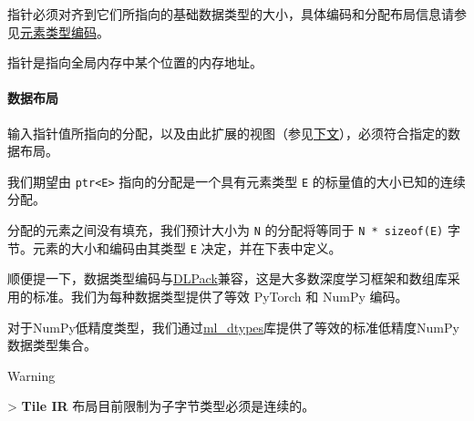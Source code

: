 \documentclass{article}
\begin{document}
指针必须对齐到它们所指向的基础数据类型的大小，具体编码和分配布局信息请参见\href{https://docs.nvidia.com/cuda/tile-ir/latest/sections/semantics.html#element-type-encoding}{元素类型编码}。


指针是指向全局内存中某个位置的内存地址。


\paragraph{数据布局}

输入指针值所指向的分配，以及由此扩展的视图（参见\href{https://docs.nvidia.com/cuda/tile-ir/latest/sections/types.html#type-views}{下文}），必须符合指定的数据布局。


我们期望由 \texttt{ptr<E>} 指向的分配是一个具有元素类型 \texttt{E} 的标量值的大小已知的连续分配。


分配的元素之间没有填充，我们预计大小为 \texttt{N} 的分配将等同于 \texttt{N * sizeof(E)} 字节。元素的大小和编码由其类型 \texttt{E} 决定，并在下表中定义。


顺便提一下，数据类型编码与\href{https://github.com/dmlc/dlpack}{DLPack}兼容，这是大多数深度学习框架和数组库采用的标准。我们为每种数据类型提供了等效 PyTorch 和 NumPy 编码。


对于NumPy低精度类型，我们通过\href{https://github.com/jax-ml/ml_dtypes}{ml\_dtypes}库提供了等效的标准低精度NumPy数据类型集合。


Warning

> \textbf{Tile IR} 布局目前限制为子字节类型必须是连续的。
\end{document}
